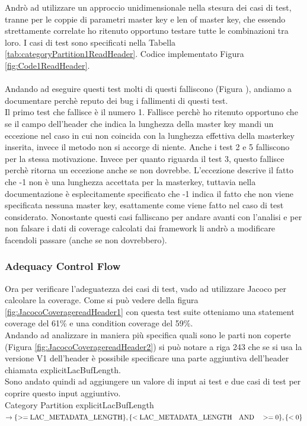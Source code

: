 \documentclass[12pt, a4paper]{article}
\begin{document}
Andrò ad utilizzare un approccio unidimensionale nella stesura dei casi 
di test, tranne per le coppie di parametri master key e len of master key,
che essendo strettamente correlate ho ritenuto opportuno testare tutte le 
combinazioni tra loro.
I casi di test sono specificati nella Tabella \ref{tab:categoryPartition1ReadHeader}.
Codice implementato Figura \ref{fig:Code1ReadHeader}. \\ \\
Andando ad eseguire questi test molti di questi falliscono (Figura ), andiamo a documentare perchè reputo 
dei bug i fallimenti di questi test. \\
Il primo test che fallisce è il numero 1. Fallisce perchè ho ritenuto opportuno che se il campo dell'header 
che indica la lunghezza della master key mandi un eccezione nel caso in cui non coincida con la lunghezza effettiva 
della masterkey inserita, invece il metodo non si accorge di niente.
Anche i test 2 e 5 falliscono per la stessa motivazione. 
Invece per quanto riguarda il test 3, questo fallisce perchè ritorna un eccezione anche se non dovrebbe. 
L'eccezione descrive il fatto che -1 non è una lunghezza accettata per la masterkey, tuttavia nella documentazione è
esplecitamente specificato che -1 indica il fatto che non viene specificata nessuna master key, esattamente come viene 
fatto nel caso di test considerato. 
Nonostante questi casi falliscano per andare avanti con l'analisi e per non falsare i dati di coverage calcolati
dai framework li andrò a modificare facendoli passare (anche se non dovrebbero).


\subsubsection{Adequacy Control Flow}
Ora per verificare l'adeguatezza dei casi di test, vado ad utilizzare
Jacoco per calcolare la coverage. Come si può vedere della figura \ref{fig:JacocoCoveragereadHeader1} con questa test suite otteniamo
una statement coverage del 61\% e una condition coverage del 59\%. \\
Andando ad analizzare in maniera più specifica quali sono le parti non coperte (Figura \ref{fig:JacocoCoveragereadHeader2})
si può notare a riga 243 che se si usa la versione V1 dell'header è possibile specificare una parte aggiuntiva dell'header
chiamata explicitLacBufLength. \\
Sono andato quindi ad aggiungere un valore di input ai test e due casi di test per coprire questo input aggiuntivo. \\
Category Partition explicitLacBufLength $\rightarrow
\{ >= \text{LAC\_METADATA\_LENGTH} \}, \\
\{ <  \text{LAC\_METADATA\_LENGTH}\quad \textrm{AND} \quad >= 0\}, 
\{ < 0 \}$ 
\end{document}
